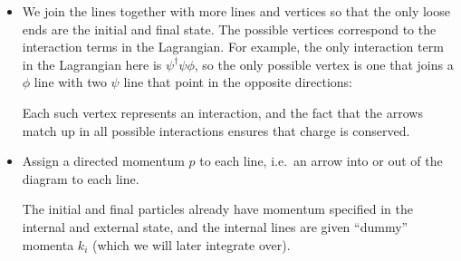 \documentclass[a4paper]{article}
\begin{document}
\begin{defi}
\begin{itemize}
\begin{center}
    \end{center}
  \item We join the lines together with more lines and vertices so that the only loose ends are the initial and final state. The possible vertices correspond to the interaction terms in the Lagrangian. For example, the only interaction term in the Lagrangian here is $\psi^\dagger \psi \phi$, so the only possible vertex is one that joins a $\phi$ line with two $\psi$ line that point in the opposite directions:
    \begin{center}
    \end{center}
    Each such vertex represents an interaction, and the fact that the arrows match up in all possible interactions ensures that charge is conserved.

    \item Assign a directed momentum $p$ to each line, i.e.\ an arrow into or out of the diagram to each line.
      \begin{center}
      \end{center}
      The initial and final particles already have momentum specified in the internal and external state, and the internal lines are given ``dummy'' momenta $k_i$ (which we will later integrate over).
  \end{itemize}
\end{defi}
\end{document}
